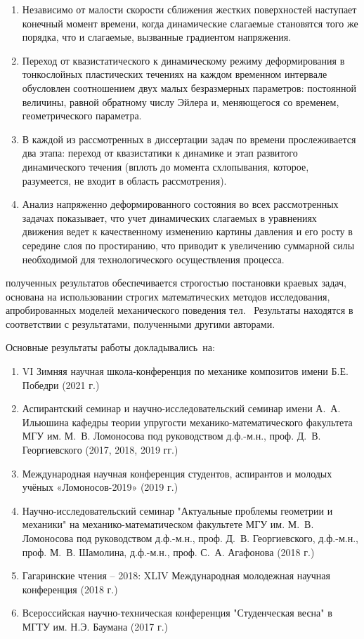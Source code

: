 {}
\begin{enumerate}[beginpenalty=10000] %
    \item Независимо от малости скорости сближения жестких поверхностей наступает конечный момент времени, когда динамические слагаемые становятся того же порядка, что и слагаемые, вызванные градиентом напряжения.
    \item Переход от квазистатического к динамическому режиму деформирования в тонкослойных пластических течениях на каждом временном интервале обусловлен соотношением двух малых безразмерных параметров: постоянной величины, равной обратному числу Эйлера и, меняющегося со временем, геометрического параметра.
    \item В каждой из рассмотренных в диссертации задач по времени прослеживается два этапа: переход от квазистатики к динамике и этап развитого динамического течения (вплоть до момента схлопывания, которое, разумеется, не входит в область рассмотрения).
    \item Анализ напряженно деформированного состояния во всех рассмотренных задачах показывает, что учет динамических слагаемых в уравнениях движения ведет к качественному изменению картины давления и его росту в середине слоя по простиранию, что приводит к увеличению суммарной силы необходимой для технологического осуществления процесса.
\end{enumerate}

{\reliability} полученных результатов обеспечивается строгостью постановки краевых задач, основана на использовании строгих математических методов исследования, апробированных моделей механического поведения тел. \ Результаты находятся в соответствии с результатами, полученными другими авторами.


{\probation}
Основные результаты работы докладывались~на:
\begin{enumerate}[beginpenalty=10000] %
    \item VI Зимняя научная школа-конференция по механике композитов имени Б.Е. Победри (2021 г.)
    \item Аспирантский семинар и научно-исследовательский семинар имени А.~А. Ильюшина кафедры теории упругости механико-математического факультета МГУ им. М.~В. Ломоносова под руководством д.ф.-м.н., проф. Д.~В. Георгиевского (2017, 2018, 2019 гг.)
    \item Международная научная конференция студентов, аспирантов и молодых учёных «Ломоносов-2019» (2019 г.)
    \item Научно-исследовательский семинар "Актуальные проблемы геометрии и механики" на механико-математическом факультете МГУ им. М.~В. Ломоносова под руководством д.ф.-м.н., проф. Д.~В. Георгиевского, д.ф.-м.н., проф. М.~В. Шамолина, д.ф.-м.н., проф. С.~А. Агафонова (2018 г.)
    \item Гагаринские чтения -- 2018: XLIV Международная молодежная научная конференция (2018 г.)
    \item Всероссийская научно-техническая конференция "Студенческая весна" в МГТУ им. Н.Э. Баумана (2017 г.)
\end{enumerate}

